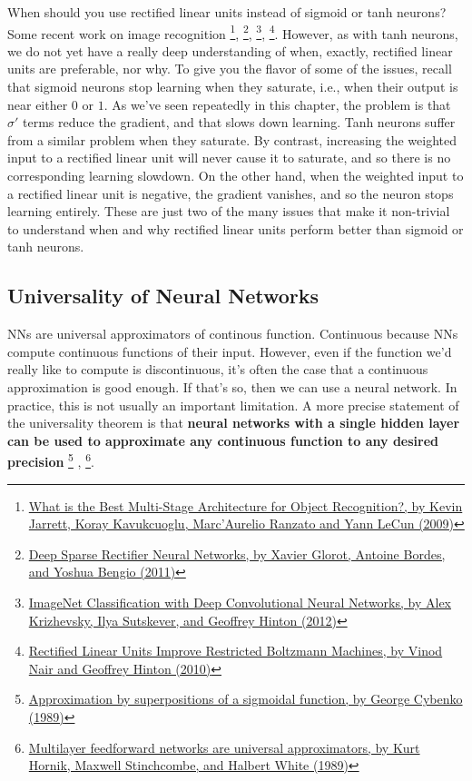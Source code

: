 \documentclass[12pt, letterpaper]{article}
\theoremstyle{definition}
\let\tb\textbf
\begin{document}
When should you use rectified linear units instead of sigmoid or tanh neurons? Some recent work on image recognition \footnote{\href{http://neuralnetworksanddeeplearning.com/chap3.html\#other\_techniques}{What is the Best Multi-Stage Architecture for Object Recognition?, by Kevin Jarrett, Koray Kavukcuoglu, Marc'Aurelio Ranzato and Yann LeCun (2009)}}, \footnote{\href{http://proceedings.mlr.press/v15/glorot11a.html}{Deep Sparse Rectifier Neural Networks, by Xavier Glorot, Antoine Bordes, and Yoshua Bengio (2011)}}, \footnote{\href{https://papers.nips.cc/paper/4824-imagenet-classification-with-deep-convolutional-neural-networks.pdf}{ImageNet Classification with Deep Convolutional Neural Networks, by Alex Krizhevsky, Ilya Sutskever, and Geoffrey Hinton (2012)}}, \footnote{\href{https://www.cs.toronto.edu/~hinton/absps/reluICML.pdf}{Rectified Linear Units Improve Restricted Boltzmann Machines, by Vinod Nair and Geoffrey Hinton (2010)}}. However, as with tanh neurons, we do not yet have a really deep understanding of when, exactly, rectified linear units are preferable, nor why. To give you the flavor of some of the issues, recall that sigmoid neurons stop learning when they saturate, i.e., when their output is near either $0$ or $1$. As we've seen repeatedly in this chapter, the problem is that $\sigma'$ terms reduce the gradient, and that slows down learning. Tanh neurons suffer from a similar problem when they saturate. By contrast, increasing the weighted input to a rectified linear unit will never cause it to saturate, and so there is no corresponding learning slowdown. On the other hand, when the weighted input to a rectified linear unit is negative, the gradient vanishes, and so the neuron stops learning entirely. These are just two of the many issues that make it non-trivial to understand when and why rectified linear units perform better than sigmoid or tanh neurons.

\subsection{Universality of Neural Networks}
NNs are universal approximators of continous function. Continuous because NNs compute continuous functions of their input. However, even if the function we'd really like to compute is discontinuous, it's often the case that a continuous approximation is good enough. If that's so, then we can use a neural network. In practice, this is not usually an important limitation. A more precise statement of the universality theorem is that \tb{neural networks with a single hidden layer can be used to approximate any continuous function to any desired precision} \footnote{\href{http://www.dartmouth.edu/~gvc/Cybenko_MCSS.pdf}{Approximation by superpositions of a sigmoidal function, by George Cybenko (1989)}} , \footnote{\href{https://www.sciencedirect.com/science/article/abs/pii/0893608089900208}{Multilayer feedforward networks are universal approximators, by Kurt Hornik, Maxwell Stinchcombe, and Halbert White (1989)}}.
\end{document}
